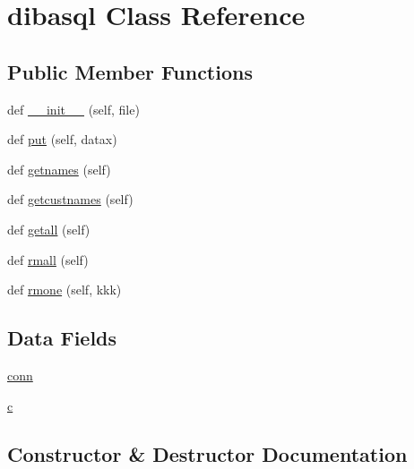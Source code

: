 \hypertarget{classpysql_1_1dibasql}{}\section{dibasql Class Reference}
\label{classpysql_1_1dibasql}
\subsection*{Public Member Functions}
\begin{DoxyCompactItemize}
\item 
def \hyperlink{classpysql_1_1dibasql_a5654bd735fb38a0b1fbcd30360b79fba}{\+\_\+\+\_\+init\+\_\+\+\_\+} (self, file)
\item 
def \hyperlink{classpysql_1_1dibasql_ab8f0549b972cab1324c807f9ddc73c50}{put} (self, datax)
\item 
def \hyperlink{classpysql_1_1dibasql_ad7a57bbd591681a9b20b607fed315546}{getnames} (self)
\item 
def \hyperlink{classpysql_1_1dibasql_ac0bbf8d35122951bf9296549a46d6cf6}{getcustnames} (self)
\item 
def \hyperlink{classpysql_1_1dibasql_ac78f029296c03a95d937befca112e593}{getall} (self)
\item 
def \hyperlink{classpysql_1_1dibasql_ac439350e2ef8c576e97f5874419c93a9}{rmall} (self)
\item 
def \hyperlink{classpysql_1_1dibasql_a80f032ac068650939402bccecbefdaf8}{rmone} (self, kkk)
\end{DoxyCompactItemize}
\subsection*{Data Fields}
\begin{DoxyCompactItemize}
\item 
\hyperlink{classpysql_1_1dibasql_a3d71ee93207c462b1690738e98283208}{conn}
\item 
\hyperlink{classpysql_1_1dibasql_ae0323a9039add2978bf5b49550572c7c}{c}
\end{DoxyCompactItemize}


\subsection{Constructor \& Destructor Documentation}
\mbox{\label{classpysql_1_1dibasql_a5654bd735fb38a0b1fbcd30360b79fba}} 
